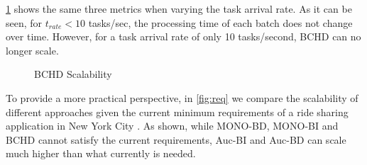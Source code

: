 \cref{fig:bss} shows the same three metrics when varying the task arrival rate. As it can be seen, for $t_{rate} < 10$ tasks/sec, the processing time of each batch does not change over time. However, for a task arrival rate of only 10 tasks/second, BCHD can no longer scale.

\begin{figure}[h]
    \centering
    \vspace{-0.15in}
    \caption{BCHD Scalability}
    \label{fig:bss}
\end{figure}

To provide a more practical perspective, in \cref{fig:req} we compare the scalability of different approaches given the current minimum requirements of a ride sharing application in New York City \cite{NYCTaxi}. As shown, while MONO-BD, MONO-BI and BCHD cannot satisfy the current requirements, Auc-BI and Auc-BD can scale much higher than what currently is needed.

